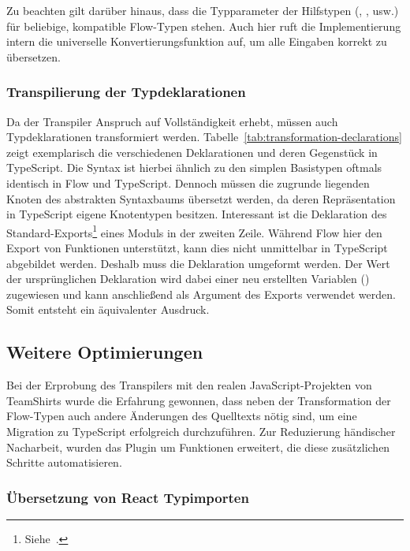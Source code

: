 {\bigbreak


Zu beachten gilt darüber hinaus, dass die Typparameter der Hilfstypen (, ,  usw.) für beliebige, kompatible Flow-Typen stehen. Auch hier ruft die Implementierung intern die universelle Konvertierungsfunktion  auf, um alle Eingaben korrekt zu übersetzen.

\subsubsection{Transpilierung der Typdeklarationen}

Da der Transpiler Anspruch auf Vollständigkeit erhebt, müssen auch Typdeklarationen transformiert werden. Tabelle~\ref{tab:transformation-declarations} zeigt exemplarisch die verschiedenen Deklarationen und deren Gegenstück in TypeScript. Die Syntax ist hierbei ähnlich zu den simplen Basistypen oftmals identisch in Flow und TypeScript. Dennoch müssen die zugrunde liegenden Knoten des abstrakten Syntaxbaums übersetzt werden, da deren Repräsentation in TypeScript eigene Knotentypen besitzen. Interessant ist die Deklaration des Standard-Exports\footnote{Siehe~\autocite[377]{ECMASCRIPT:2019}.} eines Moduls in der zweiten Zeile. Während Flow hier den Export von Funktionen unterstützt, kann dies nicht unmittelbar in TypeScript abgebildet werden. Deshalb muss die Deklaration umgeformt werden. Der Wert der ursprünglichen Deklaration wird dabei einer neu erstellten Variablen () zugewiesen und kann anschließend als Argument des Exports verwendet werden. Somit entsteht ein äquivalenter Ausdruck.

\bigbreak


\subsection{Weitere Optimierungen}
\label{subsec:optimizations}

Bei der Erprobung des Transpilers mit den realen JavaScript-Projekten von TeamShirts wurde die Erfahrung gewonnen, dass neben der Transformation der Flow-Typen auch andere Änderungen des Quelltexts nötig sind, um eine Migration zu TypeScript erfolgreich durchzuführen. Zur Reduzierung händischer Nacharbeit, wurden das Plugin um Funktionen erweitert, die diese zusätzlichen Schritte automatisieren.

\subsubsection{Übersetzung von React Typimporten}
\label{subsec:react-type-import-mapping}

}
